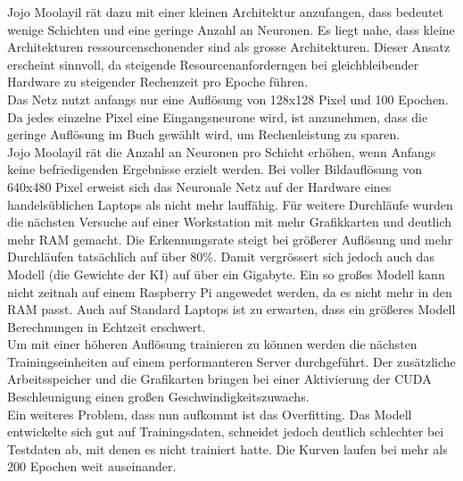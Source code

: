 \documentclass[conference]{IEEEtran}
\begin{document}
	Jojo Moolayil \cite{moolayil2019learn} rät dazu mit einer kleinen Architektur anzufangen,
	dass bedeutet wenige Schichten und eine geringe Anzahl an Neuronen. Es 
	liegt nahe, dass kleine Architekturen ressourcenschonender sind als 
	grosse Architekturen. Dieser Ansatz erscheint sinnvoll, da steigende 
	Resourcenanforderngen bei gleichbleibender Hardware zu steigender 
	Rechenzeit pro Epoche führen. \\
	
	Das Netz nutzt anfangs nur eine Auflösung von 128x128 Pixel und 100 
	Epochen. Da jedes einzelne Pixel eine Eingangsneurone wird, ist 
	anzunehmen, dass die geringe Auflösung im Buch 
	\cite{govers2018artificial} gewählt wird, um Rechenleistung zu 
	sparen. \\
	

	
	Jojo Moolayil \cite{moolayil2019learn} rät die Anzahl an Neuronen pro Schicht erhöhen, wenn Anfangs keine befriedigenden Ergebnisse erzielt werden.
	Bei voller Bildauflösung von 640x480 Pixel erweist sich das Neuronale 
	Netz auf der Hardware eines handelsüblichen Laptops als nicht mehr 
	lauffähig. Für weitere Durchläufe wurden die nächsten Versuche auf einer 
	Workstation mit mehr Grafikkarten und deutlich mehr RAM gemacht. 
	Die Erkennungsrate steigt bei größerer Auflösung und mehr Durchläufen 
	tatsächlich auf über 80\%. Damit vergrössert sich jedoch auch das Modell (die 
	Gewichte der KI) auf über ein Gigabyte. Ein so großes Modell kann nicht 
	zeitnah auf einem Raspberry Pi angewedet werden, da es nicht mehr in 
	den RAM passt. Auch auf Standard Laptops ist zu erwarten, dass ein 
	größeres Modell Berechnungen in Echtzeit erschwert. \\
	
	Um mit einer höheren Auflösung trainieren zu können werden die 
	nächsten Trainingseinheiten auf einem performanteren Server 
	durchgeführt. Der zusätzliche Arbeitsspeicher und die Grafikarten 
	bringen bei einer Aktivierung der CUDA Beschleunigung einen großen 
	Geschwindigkeitszuwachs. \\
	
	Ein weiteres Problem, dass nun aufkommt ist das Overfitting. Das Modell entwickelte sich gut auf Trainingsdaten, schneidet jedoch deutlich schlechter bei Testdaten ab, mit denen es nicht trainiert hatte. Die Kurven laufen bei mehr als 200 Epochen weit auseinander.\\
	
\end{document}

